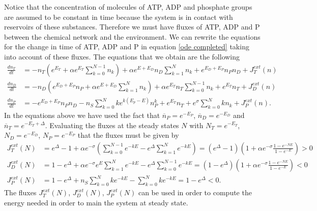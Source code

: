 \documentclass{article}
\numberwithin{equation}{section}
\theoremstyle{plain}
\begin{document}
Notice that the concentration of molecules of ATP, ADP and  phosphate groups are assumed to be constant in time because the system is in contact with reservoirs of these substances. 
Therefore we must have fluxes of ATP, ADP and P between the chemical network and the environment. 
We can rewrite the equations for the change in time of ATP, ADP and P in equation \eqref{ode completed} taking into account of these fluxes. 
The equations that we obtain are the following 
\begin{align} \label{ode completed fluxes}
    \frac{d n_T }{dt } &= - n_T \left(e^{E_T} + \alpha e^{E_T} \sum_{k=0}^{N-1} n_k \right) + \alpha e^{ E+ E_D } n_D \sum_{k=1}^{N}n_{k}  + e^{ E_D+E_P } n_P n_D +  J^{ext}_T(n)  \nonumber   \\ 
            \frac{d n_D }{dt } &= - n_D \left( e^{ E_D+E_P } n_P + \alpha e^{ E+ E_D } \sum_{k=1}^{N} n_{k} \right) + \alpha e^{E_T}  n_T \sum_{k=0}^{N-1}n_{k}  + e^{E_T} n_T  +   J^{ext}_D(n) \\
               \frac{d n_P }{dt } &= - e^{ E_D+E_P } n_P n_D - n_S  \sum_{k=0}^{N}  k e^{k (E_p - E)} n_P^k + e^{E_T} n_T + e^\sigma \sum_{k=0}^{N} k  n_k +    J^{ext}_P(n). \nonumber
\end{align}
In the equations above we have used the fact that $\overline n_P = e^{- E_P} $, $\overline n_D = e^{- E_D} $ and $\overline n_T = e^{- E_T + \Delta } $. 
Evaluating the fluxes at the steady states $N$ with  $N_T = e^{- E_T}$, $ N_D = e^{- E_D}$, $ N_P = e^{- E_P}$ that the fluxes must be given by 
\begin{align*} 
 J^{ext}_T(N)  &=  e^{\Delta } -1 + \alpha e^{- \sigma} \left( \sum_{k=
 0}^{N-1}e^{- k E} - e^\Delta  \sum_{k=
 1}^{N}e^{- k E} \right)   = \left( e^{\Delta } -1 \right) \left( 1 + \alpha e^{- \sigma} \frac{1-e^{- NE} }{ 1-e^{-E}} \right) > 0  \\
  J^{ext}_D(N)  &=   1  - e^{\Delta}  + \alpha e^{- \sigma}  e^E \sum_{k=1}^{N} e^{- k E} - e^\Delta \sum_{k=0}^{N-1} e^{- k E}  =  (1  - e^{\Delta} )\left( 1 + \alpha e^{- \sigma} \frac{1-e^{- NE} }{ 1-e^{-E}} \right)  <0 \\
   J^{ext}_P(N)  &=  1 - e^\Delta +  n_S \sum_{k=0}^{N} k e^{- k E}  -\sum_{k=0}^{N} k e^{- k E} = 1- e^\Delta <0. 
\end{align*}
The fluxes $J^{ext}_T(N) $, $J^{ext}_D(N) $, $J^{ext}_P(N) $ can be used in order to compute the energy needed in order to main the system at steady state. 
\end{document}
